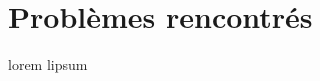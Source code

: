 \section{Problèmes rencontrés}

\begin{frame}
\tableofcontents[currentsection]
\end{frame}
\begin{frame}
lorem lipsum
\end{frame}